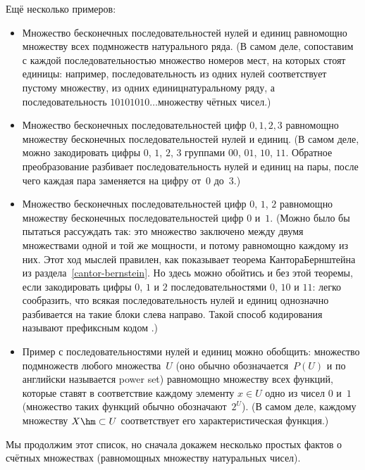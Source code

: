 \medskip
Ещё несколько примеров:
\begin{itemize}
\item
Множество бесконечных последовательностей нулей и единиц
рав\-но\-мощно множеству всех подмножеств натурального
ряда. (В самом деле, сопоставим с каждой последовательностью
множество номеров мест, на которых стоят единицы: например,
последовательность из одних нулей соответствует пустому
множеству, из одних единиц\т натуральному ряду, а
последовательность $10101010\dots$\т множеству чётных чисел.)
\item
Множество бесконечных последовательностей цифр $0,1,2,3$
равномощно множеству бесконечных последовательностей нулей и
единиц. (В самом деле, можно закодировать цифры $0$, $1$, $2$,
$3$ группами $00$, $01$, $10$, $11$. Обратное преобразование
разбивает последовательность нулей и единиц на пары, после чего
каждая пара заменяется на цифру от~$0$ до~$3$.)
\item
      \label{01-012}%
Множество бесконечных последовательностей цифр $0$, $1$, $2$
равномощно множеству бесконечных последовательностей цифр $0$ и~$1$.
(Можно было бы пытаться рассуждать так: это множество заключено
между двумя множествами одной и той же мощности, и потому
равномощно каждому из них. Этот ход мыслей
правилен, как показывает теорема Кантора\ч Бернштейна из
раздела~\ref{cantor-bernstein}.
Но здесь можно обойтись и без этой теоремы, если
закодировать цифры $0$, $1$ и $2$ последовательностями $0$, $10$
и $11$: легко сообразить, что всякая последовательность нулей и
единиц однозначно разбивается на такие блоки слева направо.
Такой способ кодирования называют  префиксным кодом%
.)

\item
Пример с последовательностями нулей и единиц можно обобщить:
множество подмножеств любого множества~$U$ (оно обычно
обозначается~$P(U)$ и по\д
английски называется power set) равномощно
множеству всех функций, которые ставят в соответствие каждому
элементу ${x\in U}$ одно из чисел $0$ и~$1$ (множество таких
функций обычно обозначают~$2^U$). (В самом деле, каждому
множеству $X\hm\subset U$ соответствует его характеристическая
функция.)

\end{itemize}

Мы продолжим этот список, но сначала докажем несколько простых
фактов о счётных множествах (равномощных множеству натуральных
чисел).

